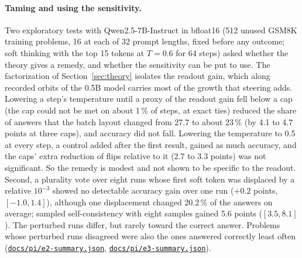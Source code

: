 \documentclass[11pt,letterpaper]{article}
\newcommand{\repourl}{https://github.com/tdj28/neural-shrimp}
\newcommand{\reporef}{arxiv-v1}
\newcommand{\repo}[1]{\href{\repourl/blob/\reporef/#1}{\nolinkurl{#1}}}
\begin{document}
\paragraph{Taming and using the sensitivity.} Two exploratory tests with Qwen2.5-7B-Instruct in bfloat16 (512
unused GSM8K training problems, 16 at each of 32 prompt lengths, fixed before any outcome; soft thinking with the top 15 tokens at $T=0.6$ for 64 steps) asked whether the theory gives a
remedy, and whether the sensitivity can be put to use. The factorization of Section~\ref{sec:theory} isolates
the readout gain, which along recorded orbits of the 0.5B model carries most of the growth that steering adds. Lowering a step's temperature until a proxy of the readout gain fell below a cap (the cap could not be met on about
1\,\% of steps, at exact ties) reduced the
share of answers that the batch layout changed from 27.7 to about 23\,\% (by 4.1 to 4.7 points at three caps), and
accuracy did not fall. Lowering the temperature to 0.5 at every step, a control added after the first result, gained
as much accuracy, and the caps' extra reduction of flips relative to it (2.7 to 3.3 points) was not significant. So
the remedy is modest and not shown to be specific to the readout. Second, a plurality vote over eight runs whose first
soft token was displaced by a relative $10^{-3}$ showed no detectable accuracy gain over one run ($+0.2$ points,
$[-1.0,1.4]$), although one displacement changed 20.2\,\% of the answers on average; sampled self-consistency with eight samples gained 5.6
points ($[3.5,8.1]$). The perturbed runs differ, but rarely toward the correct answer. Problems whose perturbed runs
disagreed were also the ones answered correctly least often (\repo{docs/pi/e2-summary.json},
\repo{docs/pi/e3-summary.json}).
\end{document}
